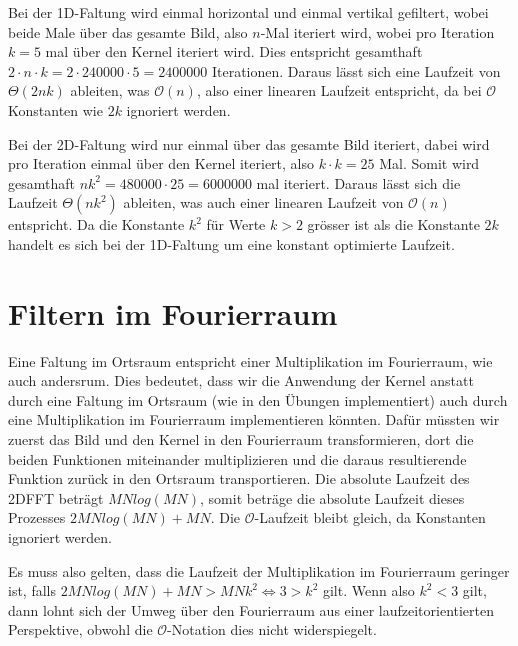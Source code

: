 \documentclass{article} %
\begin{document}
Bei der 1D-Faltung wird einmal horizontal und einmal vertikal gefiltert, wobei beide Male über das gesamte Bild, also $n$-Mal iteriert wird, wobei pro Iteration $k = 5$ mal über den Kernel iteriert wird. Dies entspricht gesamthaft $2 \cdot n \cdot k = 2 \cdot 240000 \cdot 5 = 2400000$ Iterationen. Daraus lässt sich eine Laufzeit von $\Theta (2nk)$ ableiten, was $\mathcal{O} (n)$, also einer linearen Laufzeit entspricht, da bei $\mathcal{O}$ Konstanten wie $2k$ ignoriert werden.

Bei der 2D-Faltung wird nur einmal über das gesamte Bild iteriert, dabei wird pro Iteration einmal über den Kernel iteriert, also $k \cdot k = 25$ Mal. Somit wird gesamthaft $nk^2 = 480000 \cdot 25 = 6000000$ mal iteriert. Daraus lässt sich die Laufzeit $\Theta (nk^2)$ ableiten, was auch einer linearen Laufzeit von $\mathcal{O} (n)$ entspricht. Da die Konstante $k^2$ für Werte $k > 2$ grösser ist als die Konstante $2k$ handelt es sich bei der 1D-Faltung um eine konstant optimierte Laufzeit.

\section{Filtern im Fourierraum}

Eine Faltung im Ortsraum  entspricht einer Multiplikation im Fourierraum, wie auch andersrum. Dies bedeutet, dass wir die Anwendung der Kernel anstatt durch eine Faltung im Ortsraum (wie in den Übungen implementiert) auch durch eine Multiplikation im Fourierraum implementieren könnten. Dafür müssten wir zuerst das Bild und den Kernel in den Fourierraum transformieren, dort die beiden Funktionen miteinander multiplizieren und die daraus resultierende Funktion zurück in den Ortsraum transportieren. Die absolute Laufzeit des 2DFFT beträgt $MN log(MN)$, somit beträge die absolute Laufzeit dieses Prozesses $2MN log(MN) + MN$. Die $\mathcal{O}$-Laufzeit bleibt gleich, da Konstanten ignoriert werden.

Es muss also gelten, dass die Laufzeit der Multiplikation im Fourierraum geringer ist, falls $2MN log(MN) + MN > MNk^2 \Leftrightarrow 3 > k^2$ gilt. Wenn also $k^2 < 3$ gilt, dann lohnt sich der Umweg über den Fourierraum aus einer laufzeitorientierten Perspektive, obwohl die $\mathcal{O}$-Notation dies nicht widerspiegelt.
\end{document}
